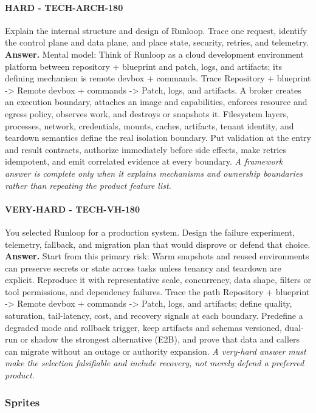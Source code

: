 \paragraph{HARD - TECH-ARCH-180} Explain the internal structure and design of Runloop. Trace one request, identify the control plane and data plane, and place state, security, retries, and telemetry.
\textbf{Answer.} Mental model: Think of Runloop as a cloud development environment platform between repository + blueprint and patch, logs, and artifacts; its defining mechanism is remote devbox + commands. Trace Repository + blueprint -> Remote devbox + commands -> Patch, logs, and artifacts. A broker creates an execution boundary, attaches an image and capabilities, enforces resource and egress policy, observes work, and destroys or snapshots it. Filesystem layers, processes, network, credentials, mounts, caches, artifacts, tenant identity, and teardown semantics define the real isolation boundary. Put validation at the entry and result contracts, authorize immediately before side effects, make retries idempotent, and emit correlated evidence at every boundary.
\textit{A framework answer is complete only when it explains mechanisms and ownership boundaries rather than repeating the product feature list.}
\paragraph{VERY-HARD - TECH-VH-180} You selected Runloop for a production system. Design the failure experiment, telemetry, fallback, and migration plan that would disprove or defend that choice.
\textbf{Answer.} Start from this primary risk: Warm snapshots and reused environments can preserve secrets or state across tasks unless tenancy and teardown are explicit. Reproduce it with representative scale, concurrency, data shape, filters or tool permissions, and dependency failures. Trace the path Repository + blueprint -> Remote devbox + commands -> Patch, logs, and artifacts; define quality, saturation, tail-latency, cost, and recovery signals at each boundary. Predefine a degraded mode and rollback trigger, keep artifacts and schemas versioned, dual-run or shadow the strongest alternative (E2B), and prove that data and callers can migrate without an outage or authority expansion.
\textit{A very-hard answer must make the selection falsifiable and include recovery, not merely defend a preferred product.}
\subsubsection*{Sprites}
